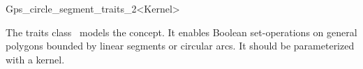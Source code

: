 \ccRefPageBegin

\begin{ccRefClass}{Gps_circle_segment_traits_2<Kernel>}

\ccThreeToTwo

\ccDefinition
The traits class \ccRefName\ models the 
concept. It enables Boolean set-operations on general polygons bounded by
linear segments or circular arcs.
It should be parameterized with a kernel.

 
\ccIsModel

\end{ccRefClass}
\ccRefPageEnd
